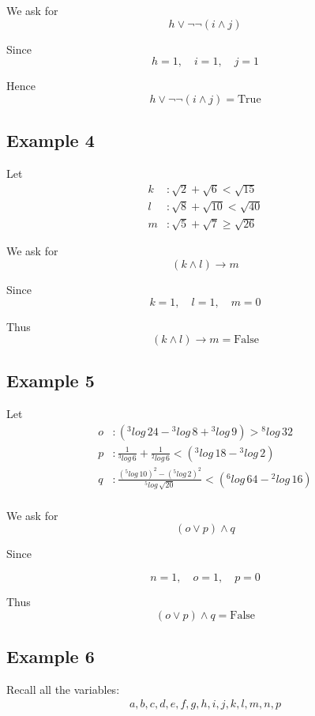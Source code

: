 \documentclass[12pt,a4paper,openany]{article}
\begin{document}
We ask for
\[
h \lor \neg \neg (i \land j)
\]

Since
\[
h = 1, \quad i = 1, \quad j = 1
\]

Hence
\[
\boxed{h \lor \neg \neg (i \land j) = \text{True}}
\]

\subsection{Example 4}\label{example-4}

Let
\[
\begin{aligned}
k &: \sqrt{2} + \sqrt{6} < \sqrt{15} \\
l &: \sqrt{8} + \sqrt{10} < \sqrt{40} \\
m &: \sqrt{5} + \sqrt{7} \ge \sqrt{26}
\end{aligned}
\]

We ask for
\[
(k \land l) \to m
\]

Since
\[
k = 1, \quad l = 1, \quad m = 0
\]

Thus
\[
\boxed{(k \land l) \to m = \text{False}}
\]

\subsection{Example 5}\label{example-5}

Let
\[
\begin{aligned}
o &: \left({}^{3}\!log\,24 - {}^{3}\!log\,8 + {}^{3}\!log\,9 \right) > {}^{8}\!log\,32\\
p &:  \frac{1}{{}^{3}\!log\,6} + \frac{1}{{}^{2}\!log\,6} <  \left({}^{3}\!log\,18 - {}^{3}\!log\,2 \right)\\ 
q &:  \frac{({}^{5}\!log\,10)^2 - ({}^{5}\!log\,2)^2 }{{}^{5}\!log\,\sqrt{20}} < \left({}^{6}\!log\,64 - {}^{2}\!log\,16 \right) \\ 
\end{aligned}
\]

We ask for
\[
(o \lor p) \land q
\]

Since

\[
n = 1, \quad o = 1, \quad p = 0
\]

Thus
\[
\boxed{(o \lor p) \land q = \text{False}}
\]

\newpage

\subsection{Example 6}\label{example-6}

Recall all the variables:
\[
\begin{aligned}
a, b, c, d, e, f, g, h, i, j, k, l, m, n, p
\end{aligned}
\]
\end{document}
